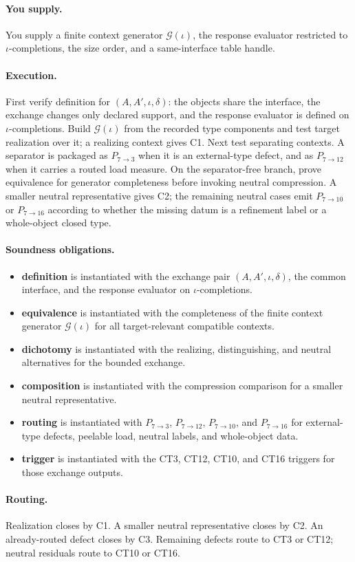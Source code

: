 \documentclass[
  11pt,
]{article}
\providecommand{\tightlist}{%
  \setlength{\itemsep}{0pt}\setlength{\parskip}{0pt}}
\theoremstyle{definition}
\newcommand{\ctpar}[1]{\paragraph{#1.}}
\begin{document}
\ctpar{You supply}
You supply a finite context generator \(\mathcal G(\iota)\), the
response evaluator restricted to \(\iota\)-completions, the size order,
and a same-interface table handle.

\ctpar{Execution}
First verify definition for \((A,A',\iota,\delta)\): the objects share the
interface, the exchange changes only declared support, and the response
evaluator is defined on \(\iota\)-completions.  Build
\(\mathcal G(\iota)\) from the recorded type components and test target
realization over it; a realizing context gives C1.  Next test separating
contexts.  A separator is packaged as \(P_{7\to3}\) when it is an
external-type defect, and as \(P_{7\to12}\) when it carries a routed
load measure.  On the separator-free branch, prove equivalence for generator
completeness before invoking neutral compression.  A smaller neutral
representative gives C2; the remaining neutral cases emit
\(P_{7\to10}\) or \(P_{7\to16}\) according to whether the missing datum
is a refinement label or a whole-object closed type.

\ctpar{Soundness obligations}
\begin{itemize}
\tightlist
\item \textbf{definition} is instantiated with the exchange pair \((A,A',\iota,\delta)\), the common interface, and the response evaluator on \(\iota\)-completions.
\item \textbf{equivalence} is instantiated with the completeness of the finite context generator \(\mathcal G(\iota)\) for all target-relevant compatible contexts.
\item \textbf{dichotomy} is instantiated with the realizing, distinguishing, and neutral alternatives for the bounded exchange.
\item \textbf{composition} is instantiated with the compression comparison for a smaller neutral representative.
\item \textbf{routing} is instantiated with \(P_{7\to3}\), \(P_{7\to12}\), \(P_{7\to10}\), and \(P_{7\to16}\) for external-type defects, peelable load, neutral labels, and whole-object data.
\item \textbf{trigger} is instantiated with the CT3, CT12, CT10, and CT16 triggers for those exchange outputs.
\end{itemize}

\ctpar{Routing}
Realization closes by C1.  A smaller neutral representative closes by
C2.  An already-routed defect closes by C3.  Remaining defects route to
CT3 or CT12; neutral residuals route to CT10 or CT16.
\end{document}
